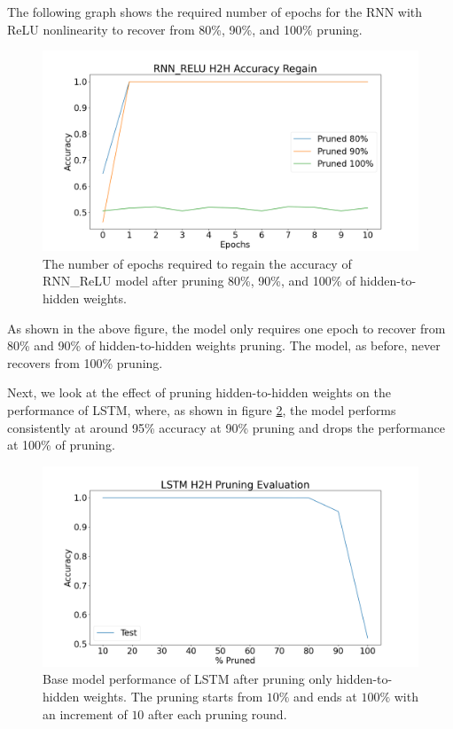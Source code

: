 The following graph shows the required number of epochs for the RNN with ReLU nonlinearity to recover from 80\%, 90\%, and 100\% pruning.

\begin{figure}[H]
	\centering
	\includegraphics[width=0.8\linewidth]{images/results/pruning_h2h/rnn_relu_h2h_accuracy_regain.png}
	\caption[RNN\_ReLU base model performance regain after pruning h2h weights]%
	{The number of epochs required to regain the accuracy of RNN\_ReLU model after pruning 80\%, 90\%, and 100\% of hidden-to-hidden weights.}
	\label{fig:rnn_relu_h2h_prune_regain}
\end{figure}

As shown in the above figure, the model only requires one epoch to recover from 80\% and 90\% of hidden-to-hidden weights pruning. The model, as before, never recovers from 100\% pruning.

Next, we look at the effect of pruning hidden-to-hidden weights on the performance of LSTM, where, as shown in figure \ref{fig:lstm_h2h_prune}, the model performs consistently at around 95\% accuracy at 90\% pruning and drops the performance at 100\% of pruning.

\begin{figure}[h]
	\centering
	\includegraphics[width=0.8\linewidth]{images/results/pruning_h2h/lstm_h2h_pruning_evaluation.png}
	\caption[LSTM base model performance after pruning h2h weights]%
	{Base model performance of LSTM after pruning only hidden-to-hidden weights. The pruning starts from $10\%$ and ends at $100\%$ with an increment of $10$ after each pruning round.}
	\label{fig:lstm_h2h_prune}
\end{figure}

